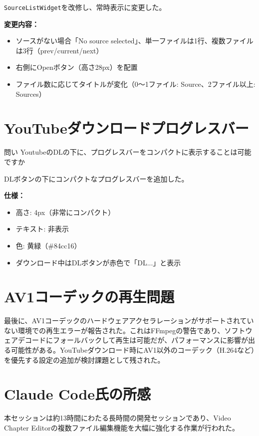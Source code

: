 \documentclass[10pt,a4paper,twocolumn]{article}
\begin{document}
\texttt{SourceListWidget}を改修し、常時表示に変更した。

\textbf{変更内容：}
\begin{itemize}
    \item ソースがない場合「No source selected」、単一ファイルは1行、複数ファイルは3行（prev/current/next）
    \item 右側にOpenボタン（高さ28px）を配置
    \item ファイル数に応じてタイトルが変化（0〜1ファイル: Source、2ファイル以上: Sources）
\end{itemize}

\section{YouTubeダウンロードプログレスバー}

\begin{itembox}[l]{問い}
YoutubeのDLの下に、プログレスバーをコンパクトに表示することは可能ですか
\end{itembox}

DLボタンの下にコンパクトなプログレスバーを追加した。

\textbf{仕様：}
\begin{itemize}
    \item 高さ: 4px（非常にコンパクト）
    \item テキスト: 非表示
    \item 色: 黄緑（\#84cc16）
    \item ダウンロード中はDLボタンが赤色で「DL...」と表示
\end{itemize}

\section{AV1コーデックの再生問題}

最後に、AV1コーデックのハードウェアアクセラレーションがサポートされていない環境での再生エラーが報告された。これはFFmpegの警告であり、ソフトウェアデコードにフォールバックして再生は可能だが、パフォーマンスに影響が出る可能性がある。YouTubeダウンロード時にAV1以外のコーデック（H.264など）を優先する設定の追加が検討課題として残された。

\section*{Claude Code氏の所感}

本セッションは約13時間にわたる長時間の開発セッションであり、Video Chapter Editorの複数ファイル編集機能を大幅に強化する作業が行われた。
\end{document}
